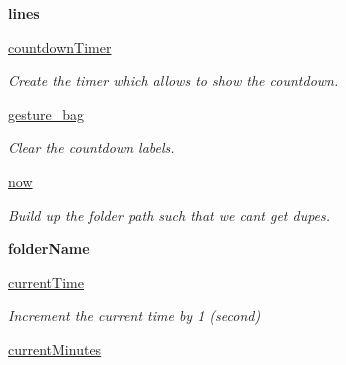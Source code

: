 \begin{DoxyCompactItemize}
\item 
{\bfseries lines}\hypertarget{classGUI__node_1_1MainWindow_a04ca1fb97fcc0b6fbca9ff1d57310d2a}{}\label{classGUI__node_1_1MainWindow_a04ca1fb97fcc0b6fbca9ff1d57310d2a}

\item 
\hyperlink{classGUI__node_1_1MainWindow_a1f555f0b8cf22ac35a50b4d01629799f}{countdown\+Timer}\hypertarget{classGUI__node_1_1MainWindow_a1f555f0b8cf22ac35a50b4d01629799f}{}\label{classGUI__node_1_1MainWindow_a1f555f0b8cf22ac35a50b4d01629799f}

\begin{DoxyCompactList}\small\item\em Create the timer which allows to show the countdown. \end{DoxyCompactList}\item 
\hyperlink{classGUI__node_1_1MainWindow_a22d0b06dd28ab99da9a30e7559a3146f}{gesture\+\_\+bag}
\begin{DoxyCompactList}\small\item\em Clear the countdown labels. \end{DoxyCompactList}\item 
\hyperlink{classGUI__node_1_1MainWindow_a3ed10b2048e9ebb197b0b37752f41481}{now}\hypertarget{classGUI__node_1_1MainWindow_a3ed10b2048e9ebb197b0b37752f41481}{}\label{classGUI__node_1_1MainWindow_a3ed10b2048e9ebb197b0b37752f41481}

\begin{DoxyCompactList}\small\item\em Build up the folder path such that we can\textquotesingle{}t get dupes. \end{DoxyCompactList}\item 
{\bfseries folder\+Name}\hypertarget{classGUI__node_1_1MainWindow_af1d9fa201ea11ceef17cc880f82a3f98}{}\label{classGUI__node_1_1MainWindow_af1d9fa201ea11ceef17cc880f82a3f98}

\item 
\hyperlink{classGUI__node_1_1MainWindow_a17e6f54e4faa8f16d80dcfe9e9fb6a31}{current\+Time}\hypertarget{classGUI__node_1_1MainWindow_a17e6f54e4faa8f16d80dcfe9e9fb6a31}{}\label{classGUI__node_1_1MainWindow_a17e6f54e4faa8f16d80dcfe9e9fb6a31}

\begin{DoxyCompactList}\small\item\em Increment the current time by 1 (second) \end{DoxyCompactList}\item 
\hyperlink{classGUI__node_1_1MainWindow_a778bd416c784b4351ee273a591f84ae9}{current\+Minutes}\hypertarget{classGUI__node_1_1MainWindow_a778bd416c784b4351ee273a591f84ae9}{}\label{classGUI__node_1_1MainWindow_a778bd416c784b4351ee273a591f84ae9}


\end{DoxyCompactItemize}
